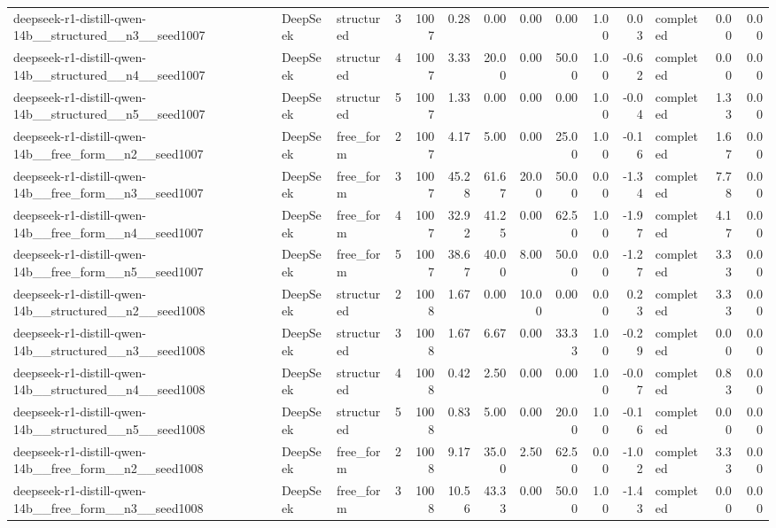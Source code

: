 \begin{longtable}{lllrrrrrrrrlrr}
deepseek-r1-distill-qwen-14b\_\_structured\_\_n3\_\_seed1007 & DeepSeek & structured & 3 & 1007 & 0.28 & 0.00 & 0.00 & 0.00 & 1.00 & 0.03 & completed & 0.00 & 0.00 \\
deepseek-r1-distill-qwen-14b\_\_structured\_\_n4\_\_seed1007 & DeepSeek & structured & 4 & 1007 & 3.33 & 20.00 & 0.00 & 50.00 & 1.00 & -0.62 & completed & 0.00 & 0.00 \\
deepseek-r1-distill-qwen-14b\_\_structured\_\_n5\_\_seed1007 & DeepSeek & structured & 5 & 1007 & 1.33 & 0.00 & 0.00 & 0.00 & 1.00 & -0.04 & completed & 1.33 & 0.00 \\
deepseek-r1-distill-qwen-14b\_\_free\_form\_\_n2\_\_seed1007 & DeepSeek & free\_form & 2 & 1007 & 4.17 & 5.00 & 0.00 & 25.00 & 1.00 & -0.16 & completed & 1.67 & 0.00 \\
deepseek-r1-distill-qwen-14b\_\_free\_form\_\_n3\_\_seed1007 & DeepSeek & free\_form & 3 & 1007 & 45.28 & 61.67 & 20.00 & 50.00 & 0.00 & -1.34 & completed & 7.78 & 0.00 \\
deepseek-r1-distill-qwen-14b\_\_free\_form\_\_n4\_\_seed1007 & DeepSeek & free\_form & 4 & 1007 & 32.92 & 41.25 & 0.00 & 62.50 & 1.00 & -1.97 & completed & 4.17 & 0.00 \\
deepseek-r1-distill-qwen-14b\_\_free\_form\_\_n5\_\_seed1007 & DeepSeek & free\_form & 5 & 1007 & 38.67 & 40.00 & 8.00 & 50.00 & 0.00 & -1.27 & completed & 3.33 & 0.00 \\
deepseek-r1-distill-qwen-14b\_\_structured\_\_n2\_\_seed1008 & DeepSeek & structured & 2 & 1008 & 1.67 & 0.00 & 10.00 & 0.00 & 0.00 & 0.23 & completed & 3.33 & 0.00 \\
deepseek-r1-distill-qwen-14b\_\_structured\_\_n3\_\_seed1008 & DeepSeek & structured & 3 & 1008 & 1.67 & 6.67 & 0.00 & 33.33 & 1.00 & -0.29 & completed & 0.00 & 0.00 \\
deepseek-r1-distill-qwen-14b\_\_structured\_\_n4\_\_seed1008 & DeepSeek & structured & 4 & 1008 & 0.42 & 2.50 & 0.00 & 0.00 & 1.00 & -0.07 & completed & 0.83 & 0.00 \\
deepseek-r1-distill-qwen-14b\_\_structured\_\_n5\_\_seed1008 & DeepSeek & structured & 5 & 1008 & 0.83 & 5.00 & 0.00 & 20.00 & 1.00 & -0.16 & completed & 0.00 & 0.00 \\
deepseek-r1-distill-qwen-14b\_\_free\_form\_\_n2\_\_seed1008 & DeepSeek & free\_form & 2 & 1008 & 9.17 & 35.00 & 2.50 & 62.50 & 0.00 & -1.02 & completed & 3.33 & 0.00 \\
deepseek-r1-distill-qwen-14b\_\_free\_form\_\_n3\_\_seed1008 & DeepSeek & free\_form & 3 & 1008 & 10.56 & 43.33 & 0.00 & 50.00 & 1.00 & -1.43 & completed & 0.00 & 0.00 \\

\end{longtable}
